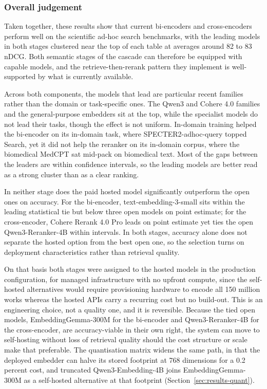 \subsubsection{Overall judgement}

Taken together, these results show that current bi-encoders and cross-encoders perform well on the scientific ad-hoc search benchmarks, with the leading models in both stages clustered near the top of each table at averages around 82 to 83 nDCG. Both semantic stages of the cascade can therefore be equipped with capable models, and the retrieve-then-rerank pattern they implement is well-supported by what is currently available.

Across both components, the models that lead are particular recent families rather than the domain or task-specific ones. The Qwen3 and Cohere 4.0 families and the general-purpose embedders sit at the top, while the specialist models do not lead their tasks, though the effect is not uniform. In-domain training helped the bi-encoder on its in-domain task, where SPECTER2-adhoc-query topped Search, yet it did not help the reranker on its in-domain corpus, where the biomedical MedCPT sat mid-pack on biomedical text. Most of the gaps between the leaders are within confidence intervals, so the leading models are better read as a strong cluster than as a clear ranking.

In neither stage does the paid hosted model significantly outperform the open ones on accuracy. For the bi-encoder, text-embedding-3-small sits within the leading statistical tie but below three open models on point estimate; for the cross-encoder, Cohere Rerank 4.0 Pro leads on point estimate yet ties the open Qwen3-Reranker-4B within intervals. In both stages, accuracy alone does not separate the hosted option from the best open one, so the selection turns on deployment characteristics rather than retrieval quality.

On that basis both stages were assigned to the hosted models in the production configuration, for managed infrastructure with no upfront compute, since the self-hosted alternatives would require provisioning hardware to encode all 150 million works whereas the hosted APIs carry a recurring cost but no build-out. This is an engineering choice, not a quality one, and it is reversible. Because the tied open models, EmbeddingGemma-300M for the bi-encoder and Qwen3-Reranker-4B for the cross-encoder, are accuracy-viable in their own right, the system can move to self-hosting without loss of retrieval quality should the cost structure or scale make that preferable. The quantisation matrix widens the same path, in that the deployed embedder can halve its stored footprint at 768 dimensions for a 0.2 percent cost, and truncated Qwen3-Embedding-4B joins EmbeddingGemma-300M as a self-hosted alternative at that footprint (Section~\ref{sec:results-quant}).

